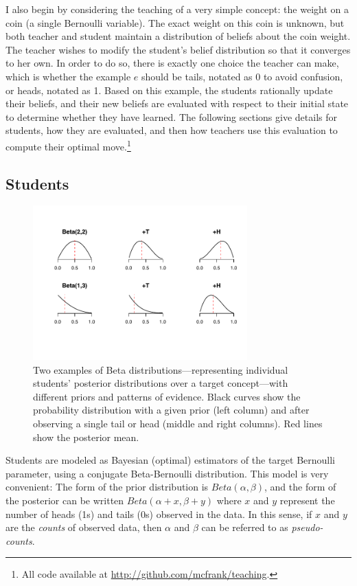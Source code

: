 \documentclass[10pt,letterpaper]{article}
\begin{document}
I also begin by considering the teaching of a very simple concept: the weight on a coin (a single Bernoulli variable). The exact weight on this coin is unknown, but both teacher and student maintain a distribution of beliefs about the coin weight. The teacher wishes to modify the student's belief distribution so that it converges to her own. In order to do so, there is exactly one choice the teacher can make, which is whether the example $e$ should be tails, notated as 0 to avoid confusion, or heads, notated as 1. Based on this example, the students rationally update their beliefs, and their new beliefs are evaluated with respect to their initial state to determine whether they have learned. The following sections give details for students, how they are evaluated, and then how teachers use this evaluation to compute their optimal move.\footnote{All code available at \url{http://github.com/mcfrank/teaching}.}

\subsection{Students}

\begin{figure}[t]
\begin{center}
\includegraphics[width=3.25in]{figures/students2.pdf}
\end{center}
\vspace{-2ex}
\caption{\label{fig:students} Two examples of Beta distributions---representing individual students' posterior distributions over a target concept---with different priors and patterns of evidence. Black curves show the probability distribution with a given prior (left column) and after observing a single tail or head (middle and right columns). Red lines show the posterior mean.}
\vspace{-2ex}
\end{figure}

Students are modeled as Bayesian (optimal) estimators of the target Bernoulli parameter, using a conjugate Beta-Bernoulli distribution. This model is very convenient: The form of the prior distribution is $Beta(\alpha,\beta)$, and the form of the posterior can be written $Beta(\alpha+x,\beta+y)$ where $x$ and $y$ represent the number of heads (1s) and tails (0s) observed in the data. In this sense, if $x$ and $y$ are the \emph{counts} of observed data, then $\alpha$ and $\beta$ can be referred to as \emph{pseudo-counts}.
\end{document}
